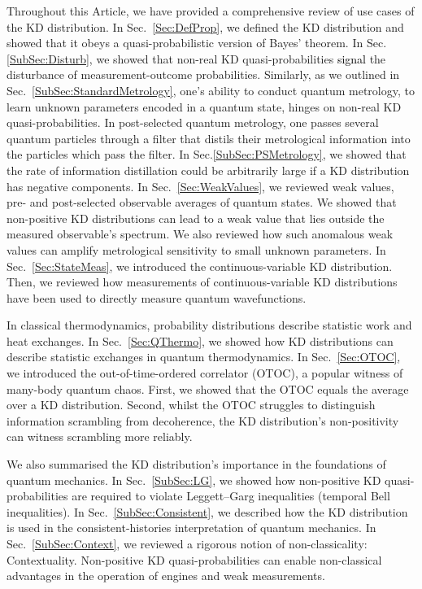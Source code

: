 \documentclass[%
 reprint,
superscriptaddress,
nofootinbib,
bibnotes,
 amsmath,amssymb,
 aps,
]{revtex4-1}
\theoremstyle{plain}
\newcommand{\Dave}[1]{\textcolor{black}{#1} }
\begin{document}
Throughout this Article,  we have provided a comprehensive review of  
use cases of the KD distribution. In Sec.~\ref{Sec:DefProp}, we 
defined the KD distribution and showed that it obeys a quasi-probabilistic version of Bayes' theorem. In Sec.\ref{SubSec:Disturb}, we showed that non-real 
KD quasi-probabilities \Dave{signal} the disturbance of measurement-outcome probabilities.
Similarly, as we outlined in Sec.~\ref{SubSec:StandardMetrology}, one’s ability to conduct quantum metrology, to learn unknown parameters encoded in a quantum state, hinges on non-real KD quasi-probabilities. In post-selected quantum metrology, one passes several quantum 
particles through a filter that distils their metrological information into the particles which pass the filter. In Sec.\ref{SubSec:PSMetrology}, we showed that the rate of information distillation could be arbitrarily large if a KD distribution has negative components. In Sec.~\ref{Sec:WeakValues}, we reviewed weak values, pre- and post-selected observable averages of quantum states. We showed that non-positive KD distributions can lead to a weak value that lies outside the measured observable's spectrum. We also reviewed how such anomalous weak values can amplify metrological sensitivity to small unknown parameters. In Sec.~\ref{Sec:StateMeas}, we introduced the continuous-variable KD distribution. Then, we reviewed how measurements of continuous-variable KD distributions have been used to directly measure quantum wavefunctions. 

In classical thermodynamics, probability distributions describe statistic work and heat exchanges. In Sec.~\ref{Sec:QThermo}, we showed how KD distributions can describe statistic exchanges in quantum thermodynamics. In Sec.~\ref{Sec:OTOC}, we introduced the out-of-time-ordered correlator (OTOC), a popular witness of many-body quantum chaos. First, we showed that the OTOC equals the average over a KD distribution. Second, whilst the OTOC struggles to distinguish information scrambling from decoherence, the KD distribution’s non-positivity can witness scrambling more reliably. 

We also summarised the KD distribution's importance in the foundations of quantum mechanics. In Sec.~\ref{SubSec:LG}, we showed how non-positive KD quasi-probabilities are required to violate Leggett--Garg inequalities (temporal Bell inequalities). In Sec.~\ref{SubSec:Consistent}, we described how the KD distribution is used in the consistent-histories interpretation of quantum mechanics. In Sec.~\ref{SubSec:Context}, we reviewed a rigorous notion of non-classicality: Contextuality. Non-positive KD quasi-probabilities can enable non-classical advantages in the operation of engines and  weak measurements.
\end{document}
